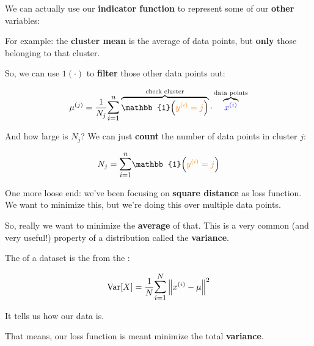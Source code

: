         We can actually use our \textbf{indicator function} to represent some of our \textbf{other} variables:
        
        For example: the \textbf{cluster mean} is the average of data points, but \textbf{only} those belonging to that cluster. 
        
        So, we can use $1(\cdot)$ to \textbf{filter} those other data points out:
        
        \begin{equation}
            \ex{\mu}{j} = \frac{1}{N_j} 
            \mathlarger{\sum_{i=1}^n} 
                \overbrace{
                    \mathbb{1} \Big( \org{\eyi = j} \Big)
                }^{ \text{check cluster} }
                \cdot
                \overbrace{
                    \blu{\exi}
                }^{ \text{data points} }
        \end{equation}
        
        And how large is $N_j$? We can just \textbf{count} the number of data points in cluster $j$:
        
        \begin{equation}
            N_j = 
            \mathlarger{\sum_{i=1}^n} 
                \mathbb{1} \Big( \org{\eyi = j} \Big)
        \end{equation}
        
        One more loose end: we've been focusing on \textbf{square distance} as loss function. We want to minimize this, but we're doing this over multiple data points.
        
        So, really we want to minimize the \textbf{average} of that. This is a very common (and very useful!) property of a distribution called the \textbf{variance}.\\
        
        \begin{definition}
            The  of a dataset is the  from the :
            
            \begin{equation*}
                \operatorname{Var}[X] = \frac{1}{N} 
                \mathlarger{\sum_{i=1}^{N}} \norm{\ex{x}{i} - \mu}^2
            \end{equation*}

            It tells us how  our data is.
        \end{definition}
        
        That means, our loss function is meant minimize the total \textbf{variance}.
            
